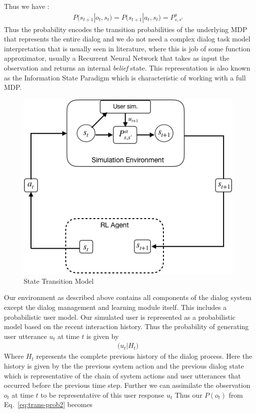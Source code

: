 \documentclass[14pt]{extarticle}
\numberwithin{equation}{section}
\begin{document}
	Thus we have :
	\begin{align}\label{eq:trans-prob2}
	P\big(s_{t+1}|o_t, s_t\big)
	= P\big(s_{t+1} | a_t, s_t\big) = P_{s,s'}^a
	\end{align}
	Thus the probability encodes the transition probabilities of the underlying MDP that represents the entire dialog and we do not need a complex dialog task model interpretation that is usually seen in literature, where this is job of some function approximator, usually a Recurrent Neural Network that takes as input the observation and returns an internal \textit{belief} state. This representation is also known as the Information State Paradigm \cite{Larsson:2000:ISD:973935.973943} which is characteristic of working with a full MDP.
	\begin{figure}[h]
		\centering
		\includegraphics[scale=0.7]{state-trans}
		\caption{State Transition Model
			\label{state-trans}}
	\end{figure}
	Our environment as described above contains all components of the dialog system except the dialog management and learning module itself. This includes a probabilistic user model. Our simulated user is represented as a probabilistic model based on the recent interaction history. Thus the probability of generating user utterance $u_t$ at time $t$ is given by 
	\begin{align}
	\big(u_t | H_t\big)
	\end{align}
	Where $H_t$ represents the complete previous history of the dialog process. Here the history is given by the the previous system action and the previous dialog state which is representative of the chain of system actions and user utterances that occurred before the previous time step. Further we can assimilate the observation $o_t$ at time $t$ to be representative of this user response $u_t$ Thus our $P(o_t)$ from Eq.\ \ref{eq:trans-prob2} becomes
\end{document}
